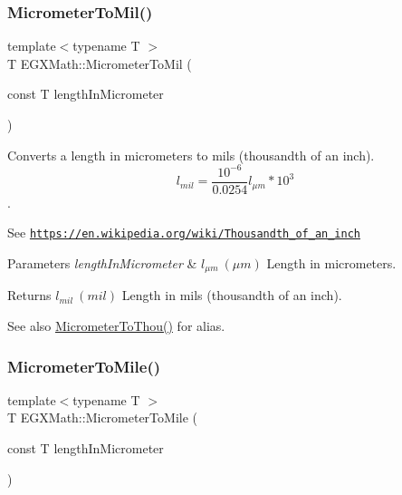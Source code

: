 \subsubsection{\texorpdfstring{Micrometer\+To\+Mil()}{MicrometerToMil()}}
{\footnotesize\ttfamily template$<$typename T $>$ \\
T E\+G\+X\+Math\+::\+Micrometer\+To\+Mil (\begin{DoxyParamCaption}\item[{const T}]{length\+In\+Micrometer }\end{DoxyParamCaption})}



Converts a length in micrometers to mils (thousandth of an inch). \[ l_{mil}= \frac{10^{-6}}{0.0254} l_{\mu m} * 10^{3} \]. 

See \href{https://en.wikipedia.org/wiki/Thousandth_of_an_inch}{\tt https\+://en.\+wikipedia.\+org/wiki/\+Thousandth\+\_\+of\+\_\+an\+\_\+inch} 
\begin{DoxyParams}{Parameters}
{\em length\+In\+Micrometer} & $ l_{\mu m}\ (\mu m)$ Length in micrometers. \\
\hline
\end{DoxyParams}
\begin{DoxyReturn}{Returns}
$ l_{mil}\ (mil)$ Length in mils (thousandth of an inch). 
\end{DoxyReturn}
\begin{DoxySeeAlso}{See also}
\mbox{\hyperlink{group___e_g_x_math-_conversions-_length_conversions-_s_i-_micrometer-_imperial_ga8a2cfa132c629695ff469f66e1ab5919}{Micrometer\+To\+Thou()}} for alias. 
\end{DoxySeeAlso}
\mbox{\label{group___e_g_x_math-_conversions-_length_conversions-_s_i-_micrometer-_imperial_ga0419c861d5edc78538ff023c12b9b6d9}} 
\subsubsection{\texorpdfstring{Micrometer\+To\+Mile()}{MicrometerToMile()}}
{\footnotesize\ttfamily template$<$typename T $>$ \\
T E\+G\+X\+Math\+::\+Micrometer\+To\+Mile (\begin{DoxyParamCaption}\item[{const T}]{length\+In\+Micrometer }\end{DoxyParamCaption})}



